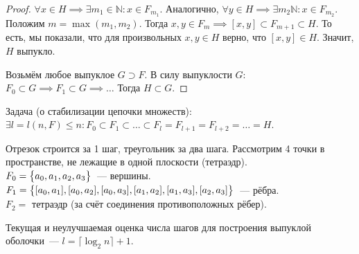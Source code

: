 \begin{enumerate}
\begin{proof}
            $\forall x \in H \implies \exists m_1 \in \mathbb{N}\colon x \in F_{m_1}$.
            Аналогично, $\forall y \in H \implies \exists m_2 \mathbb{N}\colon x \in F_{m_2}$.
            Положим $m = \max(m_1, m_2)$.
            Тогда $x, y \in F_m \implies [x, y] \subset F_{m+1} \subset H$.
            То есть, мы показали, что для произвольных $x, y \in H$ верно, что $[x, y] \in H$.
            Значит, $H$ выпукло.

            Возьмём любое выпуклое $G \supset F$.
            В силу выпуклости $G$:
            $F_0 \subset G \implies F_1 \subset G \implies \ldots$
            Тогда $H \subset G$.
        \end{proof}
\end{enumerate}

Задача (о стабилизации цепочки множеств): \\
$\exists l = l(n, F) \leqslant n\colon F_0 \subset F_1 \subset \ldots \subset F_l = F_{l+1} = F_{l+2} = \ldots = H$.

Отрезок строится за 1 шаг, треугольник за два шага.
Рассмотрим 4 точки в пространстве, не лежащие в одной плоскости (тетраэдр).\\
$F_0 = \bigl\{ a_0, a_1, a_2, a_3 \bigr\}$~--- вершины. \\
$F_1 = \bigl\{ [a_0, a_1], [a_0, a_2], [a_0, a_3], [a_1, a_2], [a_1, a_3], [a_2, a_3] \bigr\}$~--- рёбра. \\
$F_2 = $ тетраэдр (за счёт соединения противоположных рёбер).

Текущая и неулучшаемая оценка числа шагов для построения выпуклой оболочки~--- $l = \lceil \log_2 n \rceil + 1$.